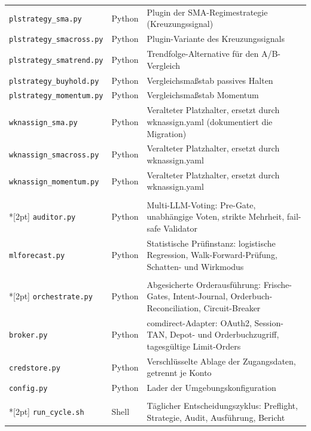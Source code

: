 \begin{longtable}{@{}p{}p{}p{}@{}}
  \texttt{plstrategy\_\allowbreak sma.py} & Python & Plugin der SMA-Regimestrategie (Kreuzungssignal) \\
  \texttt{plstrategy\_\allowbreak smacross.py} & Python & Plugin-Variante des Kreuzungssignals \\
  \texttt{plstrategy\_\allowbreak smatrend.py} & Python & Trendfolge-Alternative für den A/B-Vergleich \\
  \texttt{plstrategy\_\allowbreak buyhold.py} & Python & Vergleichsmaßstab passives Halten \\
  \texttt{plstrategy\_\allowbreak momentum.py} & Python & Vergleichsmaßstab Momentum \\
  \texttt{wknassign\_\allowbreak sma.py} & Python & Veralteter Platzhalter, ersetzt durch wknassign.yaml (dokumentiert die Migration) \\
  \texttt{wknassign\_\allowbreak smacross.py} & Python & Veralteter Platzhalter, ersetzt durch wknassign.yaml \\
  \texttt{wknassign\_\allowbreak momentum.py} & Python & Veralteter Platzhalter, ersetzt durch wknassign.yaml \\
  \addlinespace[6pt]
  \multicolumn{3}{@{}l}{\textbf{Prüfinstanzen}}\\*[2pt]
  \texttt{auditor.py} & Python & Multi-LLM-Voting: Pre-Gate, unabhängige Voten, strikte Mehrheit, fail-safe Validator \\
  \texttt{mlforecast.py} & Python & Statistische Prüfinstanz: logistische Regression, Walk-Forward-Prüfung, Schatten- und Wirkmodus \\
  \addlinespace[6pt]
  \multicolumn{3}{@{}l}{\textbf{Orderausführung und Bankanbindung}}\\*[2pt]
  \texttt{orchestrate.py} & Python & Abgesicherte Orderausführung: Frische-Gates, Intent-Journal, Orderbuch-Reconciliation, Circuit-Breaker \\
  \texttt{broker.py} & Python & comdirect-Adapter: OAuth2, Session-TAN, Depot- und Orderbuchzugriff, tagesgültige Limit-Orders \\
  \texttt{credstore.py} & Python & Verschlüsselte Ablage der Zugangsdaten, getrennt je Konto \\
  \texttt{config.py} & Python & Lader der Umgebungskonfiguration \\
  \addlinespace[6pt]
  \multicolumn{3}{@{}l}{\textbf{Betrieb und Steuerung}}\\*[2pt]
  \texttt{run\_\allowbreak cycle.sh} & Shell & Täglicher Entscheidungszyklus: Preflight, Strategie, Audit, Ausführung, Bericht \\

\end{longtable}
